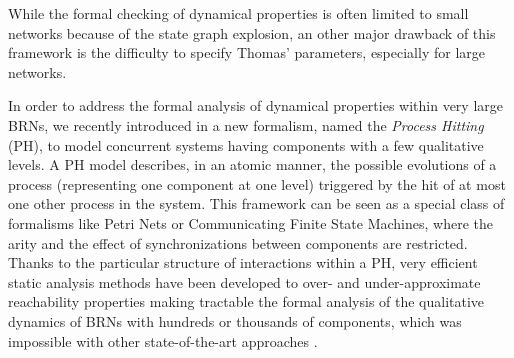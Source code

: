 While the formal checking of dynamical properties is often limited to small networks because of the
state graph explosion, an other major drawback of this framework is the difficulty to
specify Thomas' parameters, especially for large networks.

In order to address the formal analysis of dynamical properties within very large BRNs, we recently
introduced in \cite{PMR10-TCSB} a new formalism, named the \emph{Process Hitting} (PH), to model
concurrent systems having components with a few qualitative levels.
A PH model describes, in an atomic manner, the possible evolutions of a process (representing one
component at one level) triggered by the hit of at most one other process in the system.
This framework can be seen as a special class of formalisms like Petri Nets or Communicating Finite
State Machines, where the arity and the effect of synchronizations between components are
restricted.
Thanks to the particular structure of interactions within a PH, very efficient static analysis
methods have been developed to over- and under-approximate reachability properties making tractable
the formal analysis of the qualitative dynamics of BRNs with hundreds or thousands of components,
which was impossible with other state-of-the-art approaches \cite{PMR12-MSCS,PAK13-CAV,FPMR13-CS2Bio}.

